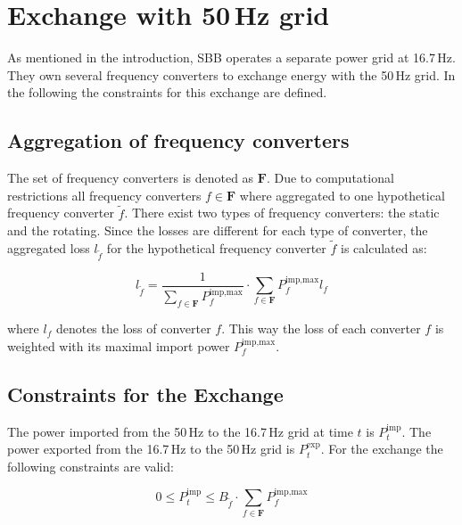 \section{Exchange with 50\,Hz grid}
As mentioned in the introduction, SBB operates a separate power grid at 16.7\,Hz. They own several frequency converters to exchange energy with the 50\,Hz grid. In the following the constraints for this exchange are defined. 

\subsection{Aggregation of frequency converters}
The set of frequency converters is denoted as $\textbf{F}$. Due to computational restrictions all frequency converters $f \in \textbf{F}$ where aggregated to one hypothetical frequency converter $\tilde{f}$. There exist two types of frequency converters: the static and the rotating. Since the losses are different for each type of converter, the aggregated loss $l_{\tilde{f}}$ for the hypothetical frequency converter $\tilde{f}$ is calculated as: 

\begin{equation*}
    l_{\tilde{f}} = \frac{1}{\sum_{f \in \textbf{F}} P^{\text{imp,max}}_{f}} \cdot \sum_{f \in \textbf{F}} P^{\text{imp,max}}_{f} l_{f}
\end{equation*}

\noindent where $l_{f}$ denotes the loss of converter $f$. This way the loss of each converter $f$ is weighted with its maximal import power $P^{\text{imp,max}}_{f}$.

\subsection{Constraints for the Exchange}
The power imported from the 50\,Hz to the 16.7\,Hz grid at time $t$ is $P^\text{imp}_{t}$. The power exported from the 16.7\,Hz to the 50\,Hz grid is $P^\text{exp}_{t}$. For the exchange the following constraints are valid:
 
\setlength{\belowdisplayskip}{0pt} 
\setlength{\abovedisplayskip}{0pt} 

\begin{equation}\label{const:export boundary}
    0 \leq P^{\text{imp}}_{t} \leq B_{\tilde{f}} \cdot \sum_{f \in \textbf{F}} P^{\text{imp,max}}_{f}
\end{equation}

\setlength{\belowdisplayskip}{12pt} 

